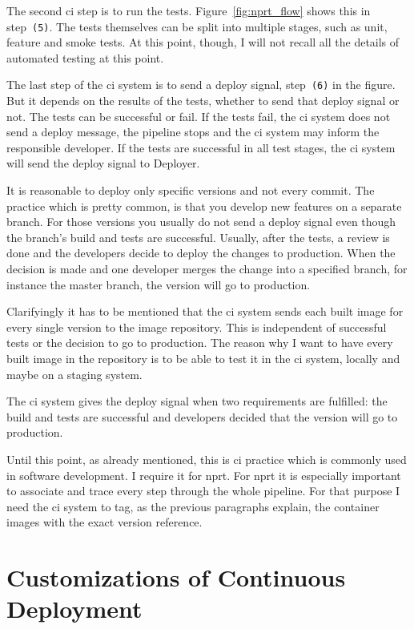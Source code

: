 The second \gls{ci} step is to run the tests. Figure~\ref{fig:nprt_flow} shows this in
step~\texttt{(5)}. The tests themselves can be split into multiple stages, such as unit,
feature and smoke tests. At this point, though, I will not recall all the details of
automated testing at this point.

The last step of the \gls{ci} system is to send a deploy signal, step~\texttt{(6)} in the
figure. But it depends on the results of the tests, whether to send that deploy signal or
not. The tests can be successful or fail. If the tests fail, the \gls{ci} system does not
send a deploy message, the pipeline stops and the \gls{ci} system may inform the
responsible developer. If the tests are successful in all test stages, the \gls{ci} system
will send the deploy signal to Deployer.

It is reasonable to deploy only specific versions and not every commit. The practice which
is pretty common, is that you develop new features on a separate branch. For those
versions you usually do not send a deploy signal even though the branch's build and tests
are successful. Usually, after the tests, a review is done and the developers decide to
deploy the changes to production. When the decision is made and one developer merges the
change into a specified branch, for instance the master branch, the version will go to
production.

Clarifyingly it has to be mentioned that the \gls{ci} system sends each built image for every single
version to the image repository. This is independent of successful tests or the decision
to go to production. The reason why I want to have every built image in the repository is
to be able to test it in the \gls{ci} system, locally and maybe on a staging system.

The \gls{ci} system gives the deploy signal when two requirements are fulfilled: the build
and tests are successful and developers decided that the version will go to production.

Until this point, as already mentioned, this is \gls{ci} practice which is commonly used
in software development. I require it for \gls{nprt}. For \gls{nprt} it is especially
important to associate and trace every step through the whole pipeline. For that purpose I
need the \gls{ci} system to tag, as the previous paragraphs explain, the container images
with the exact version reference.

\section{Customizations of Continuous Deployment}

